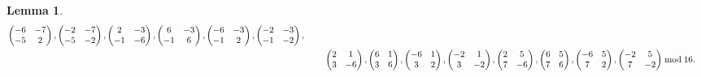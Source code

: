 \documentclass[12pt]{article}
\theoremstyle{definition}
\newtheorem{lemma}[theorem]{Lemma}
\numberwithin{equation}{section}
\numberwithin{theorem}{section}
\begin{document}
\begin{lemma}
{\begin{align*}
\begin{pmatrix}
-6 & -7 \\
-5 & 2
\end{pmatrix}, 
\begin{pmatrix}
-2 & -7 \\
-5 & -2
\end{pmatrix},    
\begin{pmatrix}
2 & -3 \\
-1 & -6
\end{pmatrix}, 
\begin{pmatrix}
6 & -3 \\
-1 & 6
\end{pmatrix}, 
\begin{pmatrix}
-6 & -3 \\
-1 & 2
\end{pmatrix}, 
\begin{pmatrix}
-2 & -3 \\
-1 & -2
\end{pmatrix},   \\
&\hspace{8mm}
\begin{pmatrix}
2 & 1 \\
3 & -6
\end{pmatrix}, 
\begin{pmatrix}
6 & 1 \\
3 & 6
\end{pmatrix}, 
\begin{pmatrix}
-6 & 1 \\
3 & 2
\end{pmatrix}, 
\begin{pmatrix}
-2 & 1 \\
3 & -2
\end{pmatrix}, 
\begin{pmatrix}
2 & 5 \\
7 & -6
\end{pmatrix}, 
\begin{pmatrix}
6 & 5 \\
7 & 6
\end{pmatrix}, 
\begin{pmatrix}
-6 & 5 \\
7 & 2
\end{pmatrix}, 
\begin{pmatrix}
-2 & 5 \\
7 & -2
\end{pmatrix}
\bmod{16}. 
\end{align*}
}
\end{lemma}
\end{document}
